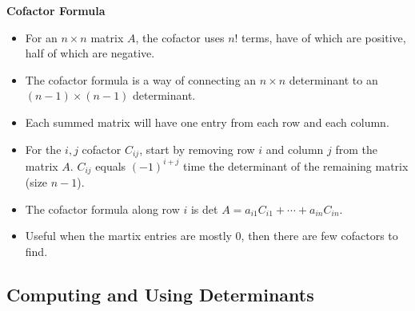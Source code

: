 \documentclass[11pt]{article}
\begin{document}
\textbf{Cofactor Formula}
\begin{itemize}
    \item For an $n \times n$ matrix $A$, the cofactor uses $n$! terms, have of which are 
    positive, half of which are negative. 
    \item The cofactor formula is a way of connecting an $n \times n$ determinant to an 
    $(n-1) \times (n-1)$ determinant.
    \item Each summed matrix will have one entry from each row and each column.
    \item For the $i,j$ cofactor $C_{ij}$, start by removing row $i$ and column $j$ from the 
    matrix $A$. $C_{ij}$ equals ${(-1)}^{i+j}$ time the determinant of the remaining matrix 
    (size $n-1$).
    \item The cofactor formula along row $i$ is det $A = a_{i1}C_{i1} + \cdots + a_{in}C_{in}$.
    \item Useful when the martix entries are mostly 0, then there are few cofactors to 
    find.
\end{itemize}

\subsection{Computing and Using Determinants}
\end{document}

